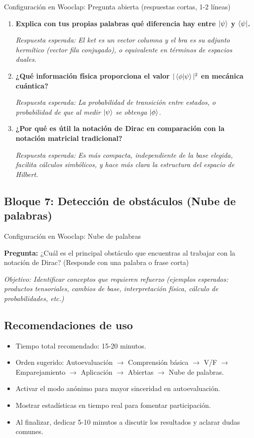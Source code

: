 \documentclass{unirTema}
\begin{document}
Configuración en Wooclap: Pregunta abierta (respuestas cortas, 1-2 líneas)

\begin{enumerate}
  \item \textbf{Explica con tus propias palabras qué diferencia hay entre $\ket{\psi}$ y $\bra{\psi}$.}

        \textit{Respuesta esperada: El ket es un vector columna y el bra es su adjunto hermítico (vector fila conjugado), o equivalente en términos de espacios duales.}

  \item \textbf{¿Qué información física proporciona el valor $|\braket{\phi}{\psi}|^2$ en mecánica cuántica?}

        \textit{Respuesta esperada: La probabilidad de transición entre estados, o probabilidad de que al medir $\ket{\psi}$ se obtenga $\ket{\phi}$.}

  \item \textbf{¿Por qué es útil la notación de Dirac en comparación con la notación matricial tradicional?}

        \textit{Respuesta esperada: Es más compacta, independiente de la base elegida, facilita cálculos simbólicos, y hace más clara la estructura del espacio de Hilbert.}
\end{enumerate}

\subsection*{Bloque 7: Detección de obstáculos (Nube de palabras)}

Configuración en Wooclap: Nube de palabras

\textbf{Pregunta:} ¿Cuál es el principal obstáculo que encuentras al trabajar con la notación de Dirac? (Responde con una palabra o frase corta)

\textit{Objetivo: Identificar conceptos que requieren refuerzo (ejemplos esperados: productos tensoriales, cambios de base, interpretación física, cálculo de probabilidades, etc.)}

\subsection*{Recomendaciones de uso}

\begin{itemize}
  \item Tiempo total recomendado: 15-20 minutos.
  \item Orden sugerido: Autoevaluación $\to$ Comprensión básica $\to$ V/F $\to$ Emparejamiento $\to$ Aplicación $\to$ Abiertas $\to$ Nube de palabras.
  \item Activar el modo anónimo para mayor sinceridad en autoevaluación.
  \item Mostrar estadísticas en tiempo real para fomentar participación.
  \item Al finalizar, dedicar 5-10 minutos a discutir los resultados y aclarar dudas comunes.
\end{itemize}
\end{document}
